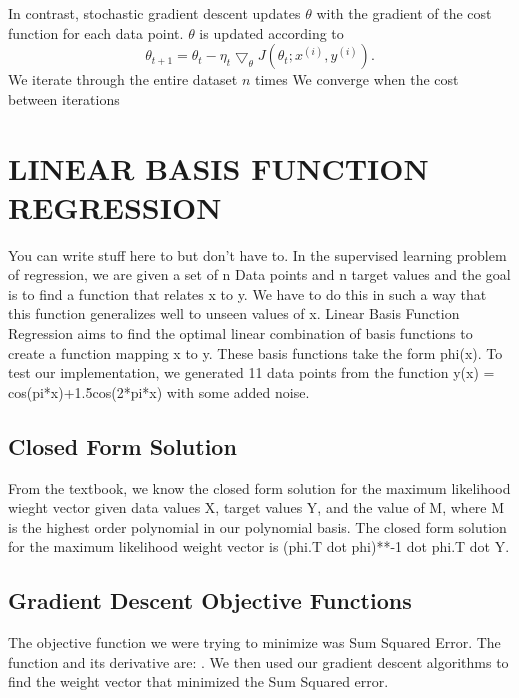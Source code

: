\documentclass[a4paper,twoside]{article}
\begin{document}
In contrast, stochastic gradient descent updates $\theta$ with the gradient of the cost function for each data point. $\theta$ is updated according to 
\begin{equation}
\theta_{t+1} = \theta_t - \eta_t \bigtriangledown_\theta J(\theta_t; x^{(i)}, y^{(i)}).
\end{equation}
 We iterate through the entire dataset $n$ times  We converge when the cost between iterations 



\section{\uppercase{Linear Basis Function Regression}}

You can write stuff here to but don't have to. In the supervised learning problem of regression, we are given a set of n Data points and n target values and the goal is to find a function that relates x to y. We have to do this in such a way that this function generalizes well to unseen values of x. Linear Basis Function Regression aims to find the optimal linear combination of basis functions to create a function mapping x to y. These basis functions take the form phi(x). To test our implementation, we generated 11 data points from the function y(x) = cos(pi*x)+1.5cos(2*pi*x) with some added noise. 

\subsection{Closed Form Solution}

From the textbook, we know the closed form solution for the maximum likelihood wieght vector given data values X, target values Y, and the value of M, where M is the highest order polynomial in our polynomial basis. The closed form solution for the maximum likelihood weight vector is (phi.T dot phi)**-1 dot phi.T dot Y. 

\subsection{Gradient Descent Objective Functions}

The objective function we were trying to minimize was Sum Squared Error. The function and its derivative are: . We then used our gradient descent algorithms to find the weight vector that minimized the Sum Squared error. 
\end{document}
